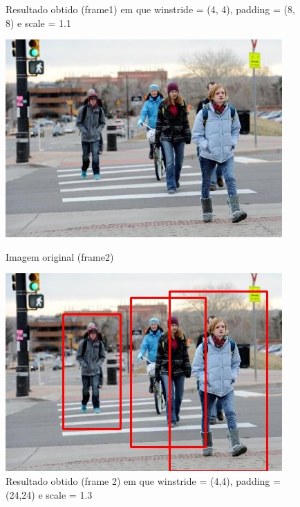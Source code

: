 \begin{figure}[h]
\begin{minipage}[b]{0.4\textwidth}
		\caption[Resultado obtido (frame1)]{Resultado obtido (frame1) em que  winstride = (4, 4), padding = (8, 8) e scale = 1.1}
		\label{comimage1esquema}
	\end{minipage}
\end{figure}



\newpage

\begin{figure}[h]
	\centering
	\begin{minipage}[b]{0.49\textwidth}
		\centering
		\includegraphics[width=\textwidth]{img/vision/exemplos/frame2.jpg}
		\caption[Imagem original (frame2)]{Imagem original (frame2) \newline \newline}
		\label{bluetth05-res}
	\end{minipage}
	\hfill
	\begin{minipage}[b]{0.49\textwidth}
		\centering
		\includegraphics[width=\textwidth]{img/vision/exemplos/result_frame2.jpg}
		\caption[Resultado obtido (frame 2)]{Resultado obtido (frame 2) em que winstride = (4,4), padding = (24,24) e scale = 1.3 }
		\label{comimagees1quema}
	\end{minipage}
\end{figure}



